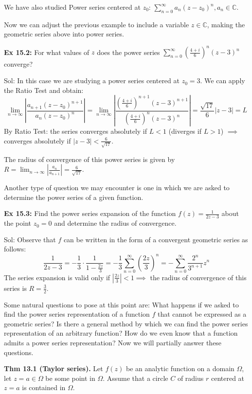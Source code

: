 \documentclass{article}
\begin{document}
We have also studied Power series centered at $z_0$: $\sum_{n=0}^{\infty} a_n(z-z_0)^n, a_n \in \mathbb{C}$.

Now we can adjust the previous example to include a variable $z \in \mathbb{C}$, making the geometric series above into power series.

\textbf{Ex 15.2:} For what values of $z$ does the power series $\sum_{n=0}^{\infty} \left(\frac{4+i}{6}\right)^n (z-3)^n$ converge?

Sol: In this case we are studying a power series centered at $z_0 = 3$. We can apply the Ratio Test and obtain:
$$ \lim_{n \to \infty} \left| \frac{a_{n+1}(z-z_0)^{n+1}}{a_n(z-z_0)^n} \right| = \lim_{n \to \infty} \left| \frac{(\frac{4+i}{6})^{n+1}(z-3)^{n+1}}{(\frac{4+i}{6})^n (z-3)^n} \right| = \frac{\sqrt{17}}{6}|z-3| = L $$
By Ratio Test: the series converges absolutely if $L < 1$ (diverges if $L > 1$) $\implies$ converges absolutely if $|z-3| < \frac{6}{\sqrt{17}}$.

The radius of convergence of this power series is given by $R = \lim_{n \to \infty} \left| \frac{a_n}{a_{n+1}} \right| = \frac{6}{\sqrt{17}}$.

Another type of question we may encounter is one in which we are asked to determine the power series of a given function.

\textbf{Ex 15.3:} Find the power series expansion of the function $f(z) = \frac{1}{2z-3}$ about the point $z_0 = 0$ and determine the radius of convergence.

Sol: Observe that $f$ can be written in the form of a convergent geometric series as follows:
$$ \frac{1}{2z-3} = -\frac{1}{3} \cdot \frac{1}{1 - \frac{2z}{3}} = -\frac{1}{3} \sum_{n=0}^{\infty} \left(\frac{2z}{3}\right)^n = -\sum_{n=0}^{\infty} \frac{2^n}{3^{n+1}}z^n $$
The series expansion is valid only if $\left|\frac{2z}{3}\right| < 1 \implies$ the radius of convergence of this series is $R = \frac{3}{2}$.

Some natural questions to pose at this point are: What happens if we asked to find the power series representation of a function $f$ that cannot be expressed as a geometric series? Is there a general method by which we can find the power series representation of an arbitrary function? How do we even know that a function admits a power series representation? Now we will partially answer these questions.

\textbf{Thm 13.1 (Taylor series).} Let $f(z)$ be an analytic function on a domain $\Omega$, let $z = a \in \Omega$ be some point in $\Omega$. Assume that a circle $C$ of radius $r$ centered at $z = a$ is contained in $\Omega$.
\end{document}
